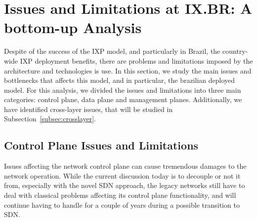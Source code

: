 \documentclass[12pt]{article}
\begin{document}

\section{Issues and Limitations at IX.BR: A bottom-up Analysis}
\label{sec:analysis}
Despite of the success of the IXP model, and particularly in Brazil, the country-wide IXP deployment benefits, there are problems and limitations imposed by the architecture and technologies is use. In this section, we study the main issues and bottlenecks that affects this model, and in particular, the brazilian deployed model. For this analysis, we divided the issues and limitations into three main categories: control plane, data plane and management planes. Additionally, we have identified cross-layer issues, that will be studied in Subsection~\ref{subsec:crosslayer}.

\subsection{Control Plane Issues and Limitations}
\label{subsec:issues_cp}
Issues affecting the network control plane can cause tremendous damages to the network operation. While the current discussion today is to decouple or not it from, especially with the novel SDN approach, the legacy networks still have to deal with classical problems affecting its control plane functionality, and will continue having to handle for a couple of years during a possible transition to SDN. 
\end{document}
